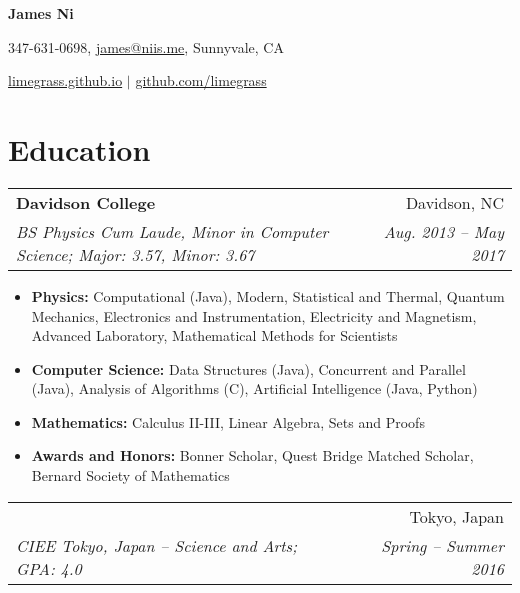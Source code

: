 \documentclass[letterpaper,11pt]{article}
\makeatletter
\newcommand{\resumeItem}[2]{
    \vspace{-2pt}
    \item\small{
        \textbf{#1}{ #2 \vspace{-2pt}}
    }
}
\newcommand{\resumeSubheading}[4]{
        \begin{tabular*}{0.97\textwidth}{l@{\extracolsep{\fill}}r}
            \textbf{#1} & #2 \\
            \textit{\small#3} & \textit{\small #4} \\
        \end{tabular*}
}
\newcommand{\resumeSubHeadingListStart}{}
\newcommand{\resumeSubHeadingListEnd}{}
\newcommand{\resumeItemListStart}{\begin{itemize}}
\newcommand{\resumeItemListEnd}{\end{itemize}}
\def\Cplusplus{C\raisebox{0.5ex}{\tiny\textbf{++}}}
\makeatother
\begin{document}

\begin{center}
    \LARGE{\textbf{James Ni}}

    \normalsize347-631-0698, \href{mailto:james@niis.me}{james@niis.me}, Sunnyvale, CA

    \normalsize\href{https://limegrass.github.io}{limegrass.github.io} $\vert$ \normalsize\href{http://github.com/limegrass}{github.com/limegrass}
\end{center}


\section{\textbf{Education}}
    \resumeSubHeadingListStart
        \resumeSubheading
            {Davidson College}{Davidson, NC}
                {BS Physics Cum Laude, Minor in Computer Science; Major: 3.57, Minor: 3.67}{Aug. 2013 -- May 2017}
            \resumeItemListStart
                \resumeItem{Physics:}
                    {Computational (Java), Modern, Statistical and Thermal, Quantum Mechanics, Electronics and Instrumentation, Electricity and Magnetism, Advanced Laboratory, Mathematical Methods for Scientists}
                \resumeItem{Computer Science:}
                    {Data Structures (Java), Concurrent and Parallel (Java), Analysis of Algorithms (\Cplusplus), Artificial Intelligence (Java, Python)}
                \resumeItem{Mathematics:}
                    {Calculus II-III, Linear Algebra, Sets and Proofs}
                \resumeItem{Awards and Honors:}
                    {Bonner Scholar, Quest Bridge Matched Scholar, Bernard Society of Mathematics}
            \resumeItemListEnd
        \resumeSubheading
            {Sophia University \begin{CJK}{UTF8}{min}(上智大学)\end{CJK} }{Tokyo, Japan}
            {CIEE Tokyo, Japan -- Science and Arts; GPA: 4.0}{Spring -- Summer 2016}
    \resumeSubHeadingListEnd
\end{document}
